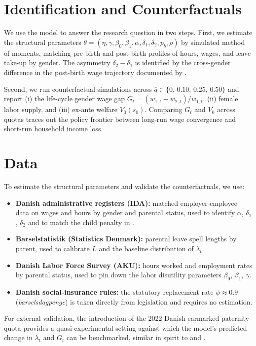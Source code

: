\section*{Identification and Counterfactuals}

We use the model to answer the research question in two steps. First, we estimate the structural parameters $\theta = (\eta, \gamma, \beta_0, \beta_1, \alpha, \delta_1, \delta_2, p_b, \rho)$ by simulated method of moments, matching pre-birth and post-birth profiles of hours, wages, and leave take-up by gender. The asymmetry $\delta_2 - \delta_1$ is identified by the cross-gender difference in the post-birth wage trajectory documented by \citet{kleven2019children}.

Second, we run counterfactual simulations across $\bar{q} \in \{0,\, 0.10,\, 0.25,\, 0.50\}$ and report (i) the life-cycle gender wage gap $G_t = (w_{1,t}-w_{2,t})/w_{1,t}$, (ii) female labor supply, and (iii) ex-ante welfare $V_0(s_0)$. Comparing $G_t$ and $V_0$ across quotas traces out the policy frontier between long-run wage convergence and short-run household income loss.

\section*{Data}

To estimate the structural parameters and validate the counterfactuals, we use:
\begin{itemize}
    \item \textbf{Danish administrative registers (IDA):} matched employer-employee data on wages and hours by gender and parental status, used to identify $\alpha$, $\delta_1$, $\delta_2$ and to match the child penalty in \citet{kleven2019children}.
    \item \textbf{Barselstatistik (Statistics Denmark):} parental leave spell lengths by parent, used to calibrate $\bar{L}$ and the baseline distribution of $\lambda_t$.
    \item \textbf{Danish Labor Force Survey (AKU):} hours worked and employment rates by parental status, used to pin down the labor disutility parameters $\beta_0$, $\beta_1$, $\gamma$.
    \item \textbf{Danish social-insurance rules:} the statutory replacement rate $\phi \approx 0.9$ (\emph{barselsdagpenge}) is taken directly from legislation and requires no estimation.
\end{itemize}

\noindent For external validation, the introduction of the 2022 Danish earmarked paternity quota provides a quasi-experimental setting against which the model's predicted change in $\lambda_t$ and $G_t$ can be benchmarked, similar in spirit to \citet{patnaik2019reserving} and \citet{carneiro2015flying}.
